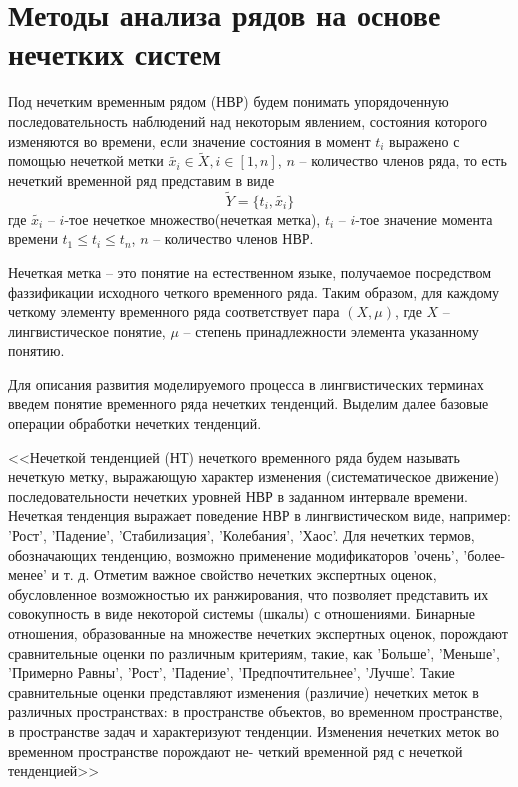 \section{Методы анализа рядов на основе нечетких систем}
Под нечетким временным рядом (НВР) будем понимать упорядоченную последовательность наблюдений над некоторым явлением, состояния которого изменяются во времени, если значение  состояния в момент $t_i$  выражено с помощью нечеткой метки
$\tilde{x_i} \in \tilde{X}, i \in [1, n]$,  $n$ – количество членов  ряда, то есть нечеткий временной ряд представим в виде 
\begin{equation}
\label{fuzzy_model_ts}
	\tilde{Y} = \lbrace t_i, \tilde{x_i} \rbrace 
\end{equation}   
где $\tilde{x_i}$ – $i$-тое нечеткое множество(нечеткая метка), $t_i$ – $i$-тое значение момента времени $t_1 \leq t_i \leq t_n$, $n$  – количество членов НВР. 

Нечеткая метка – это понятие на естественном языке, получаемое посредством фаззификации исходного четкого временного ряда. Таким образом, для каждому четкому элементу временного ряда соответствует пара $(X,\mu)$, где $X$ – лингвистическое понятие, $\mu$ – степень принадлежности элемента  указанному понятию.

Для описания развития моделируемого процесса в лингвистических терминах введем понятие временного ряда нечетких тенденций. Выделим далее базовые операции обработки нечетких тенденций. 

<<Нечеткой тенденцией (НТ) нечеткого временного ряда будем называть
нечеткую метку, выражающую характер изменения (систематическое движение)
 последовательности нечетких уровней НВР в заданном интервале времени.
Нечеткая тенденция выражает поведение НВР в лингвистическом виде, например:
 'Рост', 'Падение', 'Стабилизация', 'Колебания', 'Хаос'. Для нечетких
термов, обозначающих тенденцию, возможно применение модификаторов
'очень', 'более-менее' и т. д. Отметим важное свойство нечетких экспертных
оценок, обусловленное возможностью их ранжирования, что позволяет представить
 их совокупность в виде некоторой системы (шкалы) с отношениями.
Бинарные отношения, образованные на множестве нечетких экспертных оценок,
 порождают сравнительные оценки по различным критериям, такие, как
'Больше', 'Меньше', 'Примерно Равны', 'Рост', 'Падение', 'Предпочтительнее',
 'Лучше'. Такие сравнительные оценки представляют изменения
(различие) нечетких меток в различных пространствах: в пространстве объектов,
 во временном пространстве, в пространстве задач и характеризуют тенденции.
Изменения нечетких меток во временном пространстве порождают не-
четкий временной ряд с нечеткой тенденцией>>

